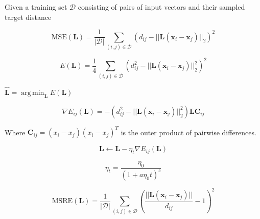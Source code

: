 \documentclass[a4paper,titlepage]{article}
\renewcommand{\vec}[1]{\mathbf{#1}}
\newcommand{\mat}[1]{\mathbf{#1}}
\DeclareMathOperator*{\argmin}{arg\,min}
\begin{document}
Given a training set $\mathcal{D}$ consisting of pairs of input vectors and their sampled target distance


\begin{equation}
\text{MSE}(\mat{L}) = \frac{1}{|\mathcal{D}|}\sum_{(i,j) \in \mathcal{D}} \left ( d_{ij} - ||\mat{L} (\vec{x}_i - \vec{x}_j)||_2 \right)^2
\label{eq:mse}
\end{equation}



\begin{equation}
E(\mat{L}) =  \frac{1}{4} \sum_{(i,j) \in \mathcal{D}} \left ( d_{ij}^2 - ||\mat{L}(\vec{x}_i - \vec{x}_j)||_2^2 \right )^2
\label{eq:opt_target}
\end{equation}


$\hat{\mat{L}} = \argmin_{\mat{L}} E(\mat{L})$

\begin{equation}
\nabla E_{ij}(\mat{L})  = - \left ( d_{ij}^2 - ||\mat{L}(\vec{x}_i - \vec{x}_j)||_2^2 \right) \mat{L} \mat{C}_{ij}
\label{eq:opt_grad}
\end{equation}

Where $\mat{C}_{ij} = (x_i - x_j)(x_i - x_j)^T$ is the outer product of pairwise differences.

\begin{equation}
\mat{L} \leftarrow \mat{L} - \eta_{t} \nabla E_{ij}(\mat{L})
\label{eq:update}
\end{equation}


\begin{equation}
\eta_{t} = \frac{\eta_0}{\left(1+ a \eta_0 t \right)^c}
\label{eq:eta_update}
\end{equation}



\begin{equation}
\text{MSRE}(\mat{L}) = \frac{1}{|\mathcal{D}|}\sum_{(i,j) \in \mathcal{D}} \left ( \frac{||\mat{L} (\vec{x}_i - \vec{x}_j)||}{d_{ij}} - 1 \right)^2
\label{eq:msre}
\end{equation}
\end{document}
